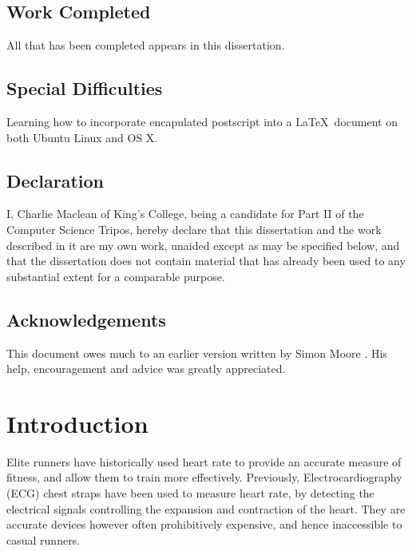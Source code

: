 \documentclass[12pt,a4paper,twoside,openright]{report}
\begin{document}
\section*{Work Completed}

All that has been completed appears in this dissertation.

\section*{Special Difficulties}

Learning how to incorporate encapulated postscript into a \LaTeX\
document on both Ubuntu Linux and OS X.
 
\newpage
\section*{Declaration}

I, Charlie Maclean of King's College, being a candidate for Part II of the 
Computer Science Tripos, hereby declare that this dissertation and the work 
described in it are my own work, unaided except as may be specified below, 
and that the dissertation does not contain material that has already been 
used to any substantial extent for a comparable purpose.

\bigskip
{}

\medskip
{}

\tableofcontents

\listoffigures

\newpage
\section*{Acknowledgements}

This document owes much to an earlier version written by Simon Moore
\cite{Moore95}.  His help, encouragement and advice was greatly 
appreciated.


\pagestyle{headings}

\chapter{Introduction}

Elite runners have historically used heart rate to provide an accurate 
measure of fitness, and allow them to train more effectively. 
Previously, Electrocardiography (ECG) chest straps have been 
used to measure heart rate, by detecting the electrical signals controlling 
the expansion and contraction of the heart. They are accurate devices however
often prohibitively expensive, and hence inaccessible to casual runners.
\end{document}
